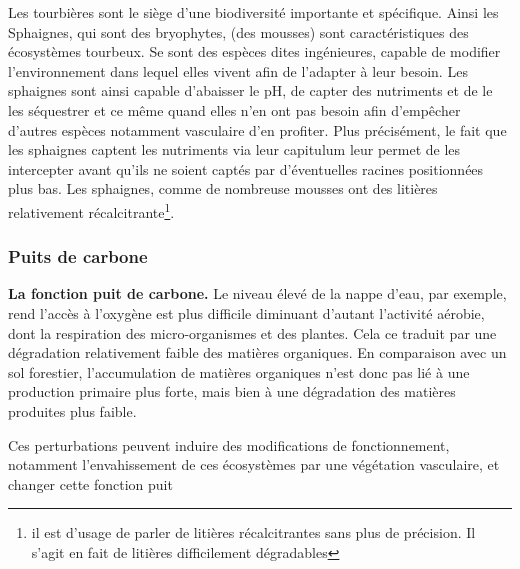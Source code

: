 Les tourbières sont le siège d'une biodiversité importante et spécifique.
Ainsi les Sphaignes, qui sont des bryophytes, (des mousses) sont caractéristiques des écosystèmes tourbeux.
Se sont des espèces dites ingénieures, capable de modifier l'environnement dans lequel elles vivent afin de l'adapter à leur besoin.
Les sphaignes sont ainsi capable d'abaisser le pH, de capter des nutriments et de le les séquestrer et ce même quand elles n'en ont pas besoin afin d'empêcher d'autres espèces notamment vasculaire d'en profiter.
Plus précisément, le fait que les sphaignes captent les nutriments via leur capitulum leur permet de les intercepter avant qu'ils ne soient captés par d'éventuelles racines positionnées plus bas.
Les sphaignes, comme de nombreuse mousses ont des litières relativement récalcitrante\footnote{il est d'usage de parler de litières récalcitrantes sans plus de précision. Il s'agit en fait de litières difficilement dégradables}.

\subsubsection{Puits de carbone}
\textbf{La fonction puit de carbone.}
Le niveau élevé de la nappe d'eau, par exemple, rend l'accès à l'oxygène est plus difficile diminuant d'autant l'activité aérobie, dont la respiration des micro-organismes et des plantes.
Cela ce traduit par une dégradation relativement faible des matières organiques.
En comparaison avec un sol forestier, l'accumulation de matières organiques n'est donc pas lié à une production primaire plus forte, mais bien à une dégradation des matières produites plus faible.

Ces perturbations peuvent induire des modifications de fonctionnement, notamment l'envahissement de ces écosystèmes par une végétation vasculaire, et changer cette fonction puit

